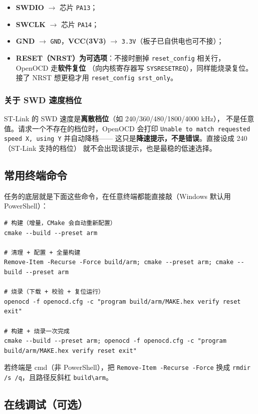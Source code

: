 \begin{itemize}
  \item \textbf{SWDIO} $\to$ 芯片 \texttt{PA13}；
  \item \textbf{SWCLK} $\to$ 芯片 \texttt{PA14}；
  \item \textbf{GND} $\to$ \texttt{GND}，\textbf{VCC(3V3)} $\to$
        \texttt{3.3V}（板子已自供电也可不接）；
  \item \textbf{RESET（NRST）为可选项}：不接时删掉
        \texttt{reset\_config} 相关行，OpenOCD 走\textbf{软件复位}
        （向内核寄存器写 \texttt{SYSRESETREQ}），同样能烧录复位。
        接了 NRST 想更稳才用 \texttt{reset\_config srst\_only}。
\end{itemize}

\subsubsection{关于 SWD 速度档位}

ST-Link 的 SWD 速度是\textbf{离散档位}（如 240/360/480/1800/4000 kHz），
不是任意值。请求一个不存在的档位时，OpenOCD 会打印
\texttt{Unable to match requested speed X, using Y} 并自动降档——
这只是\textbf{降速提示，不是错误}。直接设成 240（ST-Link 支持的档位）
就不会出现该提示，也是最稳的低速选择。

\subsection{常用终端命令}

任务的底层就是下面这些命令，在任意终端都能直接敲（Windows 默认用
PowerShell）：

\begin{lstlisting}[style=bash]
# 构建（增量，CMake 会自动重新配置）
cmake --build --preset arm

# 清理 + 配置 + 全量构建
Remove-Item -Recurse -Force build/arm; cmake --preset arm; cmake --build --preset arm

# 烧录（下载 + 校验 + 复位运行）
openocd -f openocd.cfg -c "program build/arm/MAKE.hex verify reset exit"

# 构建 + 烧录一次完成
cmake --build --preset arm; openocd -f openocd.cfg -c "program build/arm/MAKE.hex verify reset exit"
\end{lstlisting}

若终端是 cmd（非 PowerShell），把 \texttt{Remove-Item -Recurse -Force}
换成 \texttt{rmdir /s /q}，且路径反斜杠 \texttt{build\textbackslash arm}。

\subsection{在线调试（可选）}

